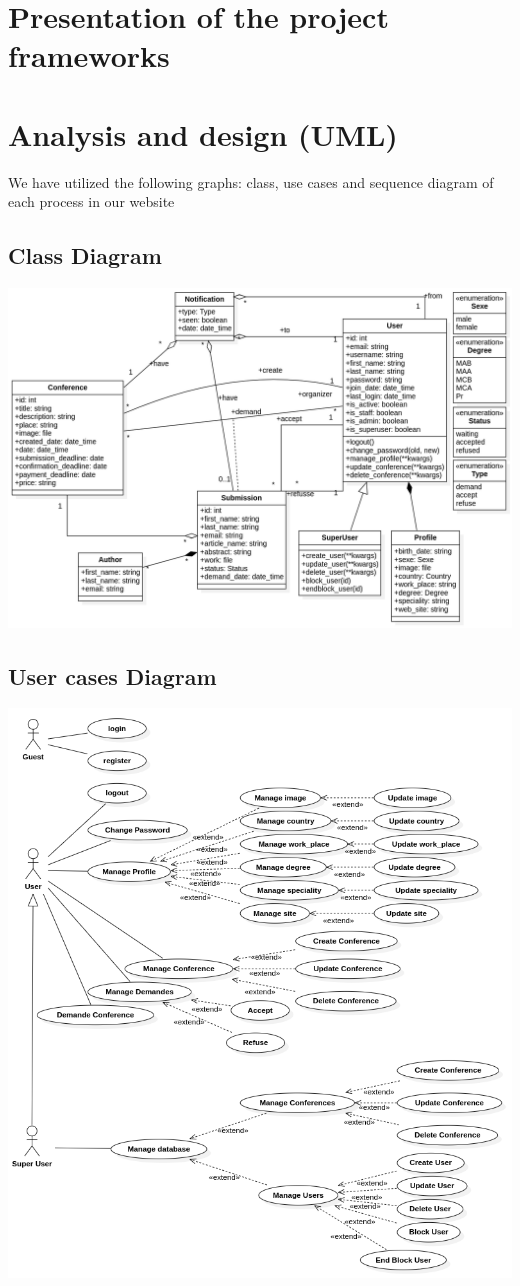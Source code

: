 \documentclass{article}
\begin{document}
	\section{Presentation of the project frameworks}
	
	\clearpage
	\section{Analysis and design (UML)}
	We have utilized the following graphs: class, use cases and sequence diagram of each process in our website
	\subsection{Class Diagram}
	\includegraphics[scale=0.3]{diagrams/class.png}
	\subsection{User cases Diagram}
	\includegraphics[scale=0.3]{diagrams/use_case.png}
\end{document}
